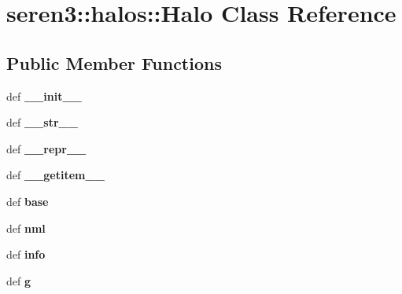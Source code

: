\hypertarget{classseren3_1_1halos_1_1Halo}{
\section{seren3::halos::Halo Class Reference}
\label{classseren3_1_1halos_1_1Halo}
}
\subsection*{Public Member Functions}
\begin{DoxyCompactItemize}
\item 
\hypertarget{classseren3_1_1halos_1_1Halo_aaec3f21c7dc262b5af60678d6dbc92c5}{
def {\bfseries \_\-\_\-init\_\-\_\-}}
\label{classseren3_1_1halos_1_1Halo_aaec3f21c7dc262b5af60678d6dbc92c5}

\item 
\hypertarget{classseren3_1_1halos_1_1Halo_a3709a463d7ad13f73995ab85dece3e6c}{
def {\bfseries \_\-\_\-str\_\-\_\-}}
\label{classseren3_1_1halos_1_1Halo_a3709a463d7ad13f73995ab85dece3e6c}

\item 
\hypertarget{classseren3_1_1halos_1_1Halo_ac13bb5657c05c6e14145da377680a25f}{
def {\bfseries \_\-\_\-repr\_\-\_\-}}
\label{classseren3_1_1halos_1_1Halo_ac13bb5657c05c6e14145da377680a25f}

\item 
\hypertarget{classseren3_1_1halos_1_1Halo_aabf34d429105f7b7a9ae217923e3fcfc}{
def {\bfseries \_\-\_\-getitem\_\-\_\-}}
\label{classseren3_1_1halos_1_1Halo_aabf34d429105f7b7a9ae217923e3fcfc}

\item 
\hypertarget{classseren3_1_1halos_1_1Halo_af6de02b18b520b168003f2cb43c4a12a}{
def {\bfseries base}}
\label{classseren3_1_1halos_1_1Halo_af6de02b18b520b168003f2cb43c4a12a}

\item 
\hypertarget{classseren3_1_1halos_1_1Halo_ac464b4d76ede1313c3c1cb4c7d5bd8ba}{
def {\bfseries nml}}
\label{classseren3_1_1halos_1_1Halo_ac464b4d76ede1313c3c1cb4c7d5bd8ba}

\item 
\hypertarget{classseren3_1_1halos_1_1Halo_ac24ff2ac53597f8ba48e90c4b1eec162}{
def {\bfseries info}}
\label{classseren3_1_1halos_1_1Halo_ac24ff2ac53597f8ba48e90c4b1eec162}

\item 
\hypertarget{classseren3_1_1halos_1_1Halo_a09ea1e6212f1cb13903fe14d0691ed83}{
def {\bfseries g}}
\label{classseren3_1_1halos_1_1Halo_a09ea1e6212f1cb13903fe14d0691ed83}


\end{DoxyCompactItemize}
